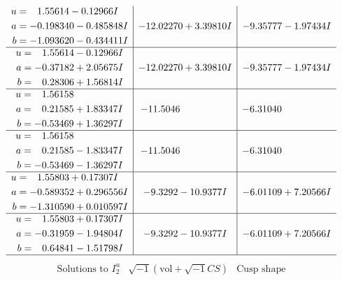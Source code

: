 \documentclass[1p]{elsarticle_modified}
\theoremstyle{definition}
\newcommand{\I}{\sqrt{-1}}
\begin{document}
$$\begin{array}{c|c|c}
\begin{aligned}
u &= \phantom{-}1.55614 - 0.12966 I \\
a &= -0.198340 - 0.485848 I \\
b &= -1.093620 - 0.434411 I\end{aligned}
 & -12.02270 + 3.39810 I & -9.35777 - 1.97434 I \\ \hline\begin{aligned}
u &= \phantom{-}1.55614 - 0.12966 I \\
a &= -0.37182 + 2.05675 I \\
b &= \phantom{-}0.28306 + 1.56814 I\end{aligned}
 & -12.02270 + 3.39810 I & -9.35777 - 1.97434 I \\ \hline\begin{aligned}
u &= \phantom{-}1.56158\phantom{ +0.000000I} \\
a &= \phantom{-}0.21585 + 1.83347 I \\
b &= -0.53469 + 1.36297 I\end{aligned}
 & -11.5046\phantom{ +0.000000I} & -6.31040\phantom{ +0.000000I} \\ \hline\begin{aligned}
u &= \phantom{-}1.56158\phantom{ +0.000000I} \\
a &= \phantom{-}0.21585 - 1.83347 I \\
b &= -0.53469 - 1.36297 I\end{aligned}
 & -11.5046\phantom{ +0.000000I} & -6.31040\phantom{ +0.000000I} \\ \hline\begin{aligned}
u &= \phantom{-}1.55803 + 0.17307 I \\
a &= -0.589352 + 0.296556 I \\
b &= -1.310590 + 0.010597 I\end{aligned}
 & -9.3292 - 10.9377 I & -6.01109 + 7.20566 I \\ \hline\begin{aligned}
u &= \phantom{-}1.55803 + 0.17307 I \\
a &= -0.31959 - 1.94804 I \\
b &= \phantom{-}0.64841 - 1.51798 I\end{aligned}
 & -9.3292 - 10.9377 I & -6.01109 + 7.20566 I\\
 \hline 
 \end{array}$$\newpage$$\begin{array}{c|c|c}  
\text{Solutions to }I^u_{2}& \I (\text{vol} + \sqrt{-1}CS) & \text{Cusp shape}\\
 \hline 
\begin{aligned}

\end{aligned}
\end{array}$$
\end{document}
